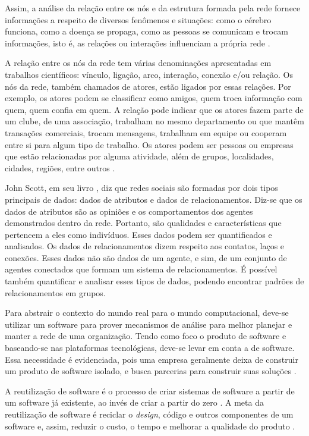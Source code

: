 Assim, a análise da relação entre os nós e da estrutura formada pela rede fornece informações a respeito de diversos fenômenos e situações: como o cérebro funciona, como a doença se propaga, como as pessoas se comunicam e trocam informações, isto é, as relações ou interações influenciam a própria rede \cite{Goular:2014}.

A relação entre os nós da rede tem várias denominações apresentadas em trabalhos científicos: vínculo, ligação, arco, interação, conexão e/ou relação. Os nós da rede, também chamados de atores, estão ligados por essas relações. Por exemplo, os atores podem se classificar como amigos, quem troca informação com quem, quem confia em quem. A relação pode indicar que os atores fazem parte de um clube, de uma associação, trabalham no mesmo departamento ou que mantêm transações comerciais, trocam mensagens, trabalham em equipe ou cooperam entre si para algum tipo de trabalho. Os atores podem ser pessoas ou empresas que estão relacionadas por alguma atividade, além de grupos, localidades, cidades, regiões, entre outros \cite{Hanneman:Riddle:2005}.

John Scott, em seu livro \cite{Scott:Carrington:2011}, diz que redes sociais são formadas por dois tipos principais de dados: dados de atributos e dados de relacionamentos. Diz-se que os dados de atributos são as opiniões e os comportamentos dos agentes demonstrados dentro da rede. Portanto, são qualidades e características que pertencem a eles como indivíduos. Esses dados podem ser quantificados e analisados. Os dados de relacionamentos dizem respeito aos contatos, laços e conexões. Esses dados não são dados de um agente, e sim, de um conjunto de agentes conectados que formam um sistema de relacionamentos. É possível também quantificar e analisar esses tipos de dados, podendo encontrar padrões de relacionamentos em grupos.

Para abstrair o contexto do mundo real para o mundo computacional, deve-se utilizar um software para prover mecanismos de análise para melhor planejar e manter a rede de uma organização. Tendo como foco o produto de software e baseando-se nas plataformas tecnológicas, deve-se levar em conta a  de software. Essa necessidade é evidenciada, pois uma empresa geralmente deixa de construir um produto de software isolado, e busca parcerias para construir suas soluções \cite{Lima:2015}.

A reutilização de software é o processo de criar sistemas de software a partir de um software já existente, ao invés de criar a partir do zero \cite{Krueger:1992}. A meta da reutilização de software é reciclar o \textit{design}, código e outros componentes de um software e, assim, reduzir o custo, o tempo e melhorar a qualidade do produto \cite{Keswani:Joshi:Jatain:2014}.

